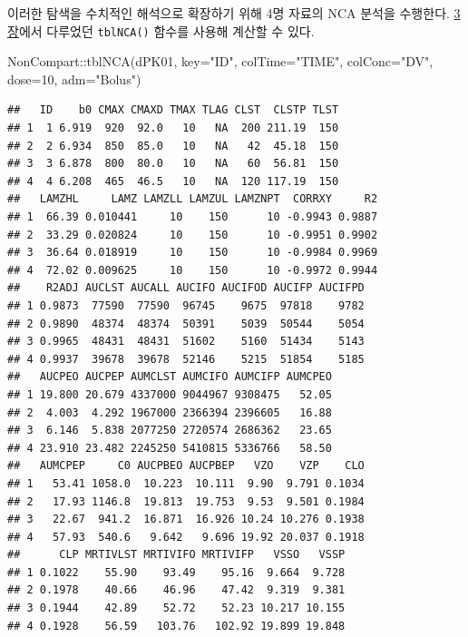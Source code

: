 \documentclass[
  11pt,
  krantz2, a4paper, twoside]{krantz}
\newenvironment{Shaded}{\begin{snugshade}}{\end{snugshade}}
\newcommand{\AttributeTok}[1]{\textcolor[rgb]{0.77,0.63,0.00}{#1}}
\newcommand{\DecValTok}[1]{\textcolor[rgb]{0.00,0.00,0.81}{#1}}
\newcommand{\FunctionTok}[1]{\textcolor[rgb]{0.00,0.00,0.00}{#1}}
\newcommand{\NormalTok}[1]{#1}
\newcommand{\SpecialCharTok}[1]{\textcolor[rgb]{0.00,0.00,0.00}{#1}}
\newcommand{\StringTok}[1]{\textcolor[rgb]{0.31,0.60,0.02}{#1}}
\theoremstyle{definition}
\theoremstyle{definition}
\theoremstyle{definition}
\theoremstyle{definition}
\theoremstyle{remark}
\begin{document}
이러한 탐색을 수치적인 해석으로 확장하기 위해 4명 자료의 NCA 분석을 수행한다. \protect\hyperlink{nca-analysis}{3장}에서 다루었던 \texttt{tblNCA()} 함수를 사용해 계산할 수 있다.

\begin{Shaded}
\begin{Highlighting}[]
\NormalTok{NonCompart}\SpecialCharTok{::}\FunctionTok{tblNCA}\NormalTok{(dPK01, }\AttributeTok{key=}\StringTok{"ID"}\NormalTok{, }\AttributeTok{colTime=}\StringTok{"TIME"}\NormalTok{, }
                   \AttributeTok{colConc=}\StringTok{"DV"}\NormalTok{, }\AttributeTok{dose=}\DecValTok{10}\NormalTok{, }\AttributeTok{adm=}\StringTok{"Bolus"}\NormalTok{)}
\end{Highlighting}
\end{Shaded}

\begin{verbatim}
##   ID    b0 CMAX CMAXD TMAX TLAG CLST  CLSTP TLST
## 1  1 6.919  920  92.0   10   NA  200 211.19  150
## 2  2 6.934  850  85.0   10   NA   42  45.18  150
## 3  3 6.878  800  80.0   10   NA   60  56.81  150
## 4  4 6.208  465  46.5   10   NA  120 117.19  150
##   LAMZHL     LAMZ LAMZLL LAMZUL LAMZNPT  CORRXY     R2
## 1  66.39 0.010441     10    150      10 -0.9943 0.9887
## 2  33.29 0.020824     10    150      10 -0.9951 0.9902
## 3  36.64 0.018919     10    150      10 -0.9984 0.9969
## 4  72.02 0.009625     10    150      10 -0.9972 0.9944
##    R2ADJ AUCLST AUCALL AUCIFO AUCIFOD AUCIFP AUCIFPD
## 1 0.9873  77590  77590  96745    9675  97818    9782
## 2 0.9890  48374  48374  50391    5039  50544    5054
## 3 0.9965  48431  48431  51602    5160  51434    5143
## 4 0.9937  39678  39678  52146    5215  51854    5185
##   AUCPEO AUCPEP AUMCLST AUMCIFO AUMCIFP AUMCPEO
## 1 19.800 20.679 4337000 9044967 9308475   52.05
## 2  4.003  4.292 1967000 2366394 2396605   16.88
## 3  6.146  5.838 2077250 2720574 2686362   23.65
## 4 23.910 23.482 2245250 5410815 5336766   58.50
##   AUMCPEP     C0 AUCPBEO AUCPBEP   VZO    VZP    CLO
## 1   53.41 1058.0  10.223  10.111  9.90  9.791 0.1034
## 2   17.93 1146.8  19.813  19.753  9.53  9.501 0.1984
## 3   22.67  941.2  16.871  16.926 10.24 10.276 0.1938
## 4   57.93  540.6   9.642   9.696 19.92 20.037 0.1918
##      CLP MRTIVLST MRTIVIFO MRTIVIFP   VSSO   VSSP
## 1 0.1022    55.90    93.49    95.16  9.664  9.728
## 2 0.1978    40.66    46.96    47.42  9.319  9.381
## 3 0.1944    42.89    52.72    52.23 10.217 10.155
## 4 0.1928    56.59   103.76   102.92 19.899 19.848
\end{verbatim}
\end{document}
